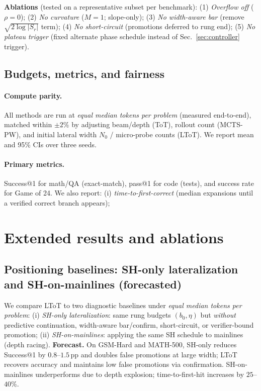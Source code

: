 \documentclass{article}
\begin{document}
\noindent\textbf{Ablations} (tested on a representative subset per benchmark):
(1) \emph{Overflow off} ($\rho{=}0$);
(2) \emph{No curvature} ($M{=}1$; slope-only);
(3) \emph{No width-aware bar} (remove $\sqrt{2\log |S_r|}$ term);
(4) \emph{No short-circuit} (promotions deferred to rung end);
(5) \emph{No plateau trigger} (fixed alternate phase schedule instead of Sec.~\ref{sec:controller} trigger).



\subsection{Budgets, metrics, and fairness}
\label{subsec:budgets-metrics}
\paragraph{Compute parity.}
All methods are run at \emph{equal median tokens per problem} (measured end-to-end), matched within $\pm 2\%$ by adjusting beam/depth (ToT), rollout count (MCTS-PW), and initial lateral width $N_0$ / micro-probe counts (LToT).
We report mean and 95\% CIs over three seeds.

\paragraph{Primary metrics.}
Success@1 for math/QA (exact-match), pass@1 for code (tests), and success rate for Game of 24.
We also report:
(i) \emph{time-to-first-correct} (median expansions until a verified correct branch appears);
\section{Extended results and ablations}\label{app:extended}
\subsection{Positioning baselines: SH-only lateralization and SH-on-mainlines (forecasted)}
\label{subsec:positioning}
We compare LToT to two diagnostic baselines under \emph{equal median tokens per problem}:
(i) \emph{SH-only lateralization}: same rung budgets $(b_0,\eta)$ but \emph{without} predictive continuation, width-aware bar/confirm, short-circuit, or verifier-bound promotion;
(ii) \emph{SH-on-mainlines}: applying the same SH schedule to mainlines (depth racing).
\textbf{Forecast.} On GSM-Hard and MATH-500, SH-only reduces Success@1 by $0.8$--$1.5$\,pp and doubles false promotions at large width;
LToT recovers accuracy and maintains low false promotions via confirmation. SH-on-mainlines underperforms due to depth explosion;
time-to-first-hit increases by $25$--$40$\%.
\end{document}
